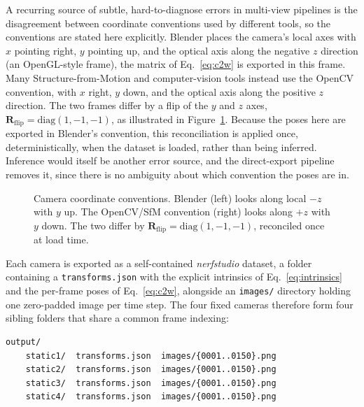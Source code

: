 A recurring source of subtle, hard-to-diagnose errors in multi-view pipelines is the
disagreement between coordinate conventions used by different tools, so the
conventions are stated here explicitly. Blender places the camera's local axes with
$x$ pointing right, $y$ pointing up, and the optical axis along the negative
$z$ direction (an OpenGL-style frame), the matrix of Eq.~\eqref{eq:c2w} is exported
in this frame. Many Structure-from-Motion and computer-vision tools instead use the
OpenCV convention, with $x$ right, $y$ down, and the optical axis along the
positive $z$ direction. The two frames differ by a flip of the $y$ and $z$
axes, $\mathbf{R}_{\text{flip}} = \mathrm{diag}(1,-1,-1)$, as illustrated in
Figure~\ref{fig:coord}. Because the poses here are exported in Blender's convention,
this reconciliation is applied once, deterministically, when the dataset is loaded,
rather than being inferred. Inference would itself be another error source, and the
direct-export pipeline removes it, since there is no ambiguity about which convention
the poses are in.

\begin{figure}[!ht]
    \centering
    
    \caption{Camera coordinate conventions. Blender (left) looks along local $-z$
    with $y$ up. The OpenCV/SfM convention (right) looks along $+z$ with $y$ down.
    The two differ by $\mathbf{R}_{\text{flip}} = \mathrm{diag}(1,-1,-1)$, reconciled
    once at load time.}
    \label{fig:coord}
\end{figure}

Each camera is exported as a self-contained \emph{nerfstudio} dataset, a folder containing a
\texttt{transforms.json} with the explicit intrinsics of Eq.~\eqref{eq:intrinsics} and
the per-frame poses of Eq.~\eqref{eq:c2w}, alongside an \texttt{images/} directory
holding one zero-padded image per time step. The four fixed cameras therefore form
four sibling folders that share a common frame indexing:

\noindent
\begin{minipage}{\linewidth}
\begin{verbatim}
output/
    static1/  transforms.json  images/{0001..0150}.png
    static2/  transforms.json  images/{0001..0150}.png
    static3/  transforms.json  images/{0001..0150}.png
    static4/  transforms.json  images/{0001..0150}.png
\end{verbatim}
\end{minipage}

